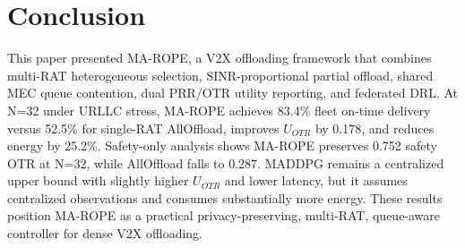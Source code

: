 \section{Conclusion}

This paper presented MA-ROPE, a V2X offloading framework that combines multi-RAT heterogeneous selection, SINR-proportional partial offload, shared MEC queue contention, dual PRR/OTR utility reporting, and federated DRL. At N=32 under URLLC stress, MA-ROPE achieves 83.4\% fleet on-time delivery versus 52.5\% for single-RAT AllOffload, improves $U_{OTR}$ by 0.178, and reduces energy by 25.2\%. Safety-only analysis shows MA-ROPE preserves 0.752 safety OTR at N=32, while AllOffload falls to 0.287. MADDPG remains a centralized upper bound with slightly higher $U_{OTR}$ and lower latency, but it assumes centralized observations and consumes substantially more energy. These results position MA-ROPE as a practical privacy-preserving, multi-RAT, queue-aware controller for dense V2X offloading.